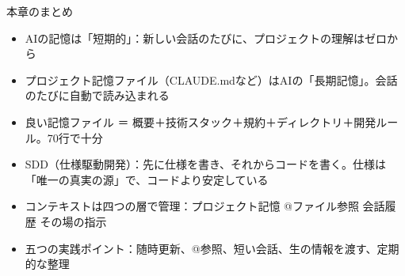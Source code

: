 \begin{tcbsummary}{本章のまとめ}
\begin{itemize}
  \item AIの記憶は「短期的」：新しい会話のたびに、プロジェクトの理解はゼロから
  \item プロジェクト記憶ファイル（CLAUDE.mdなど）はAIの「長期記憶」。会話のたびに自動で読み込まれる
  \item 良い記憶ファイル ＝ 概要＋技術スタック＋規約＋ディレクトリ＋開発ルール。70行で十分
  \item SDD（仕様駆動開発）：先に仕様を書き、それからコードを書く。仕様は「唯一の真実の源」で、コードより安定している
  \item コンテキストは四つの層で管理：プロジェクト記憶 @ファイル参照 会話履歴 その場の指示
  \item 五つの実践ポイント：随時更新、@参照、短い会話、生の情報を渡す、定期的な整理
\end{itemize}

\end{tcbsummary}
